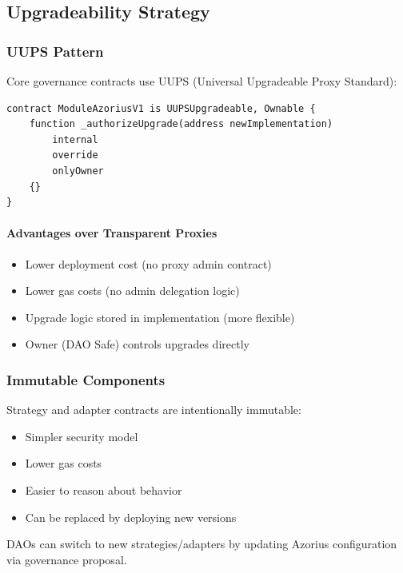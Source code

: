 \subsection{Upgradeability Strategy}

\subsubsection{UUPS Pattern}

Core governance contracts use UUPS (Universal Upgradeable Proxy Standard):

\begin{lstlisting}[caption=UUPS Upgrade Authorization]
contract ModuleAzoriusV1 is UUPSUpgradeable, Ownable {
    function _authorizeUpgrade(address newImplementation)
        internal
        override
        onlyOwner
    {}
}
\end{lstlisting}

\paragraph{Advantages over Transparent Proxies}
\begin{itemize}
    \item Lower deployment cost (no proxy admin contract)
    \item Lower gas costs (no admin delegation logic)
    \item Upgrade logic stored in implementation (more flexible)
    \item Owner (DAO Safe) controls upgrades directly
\end{itemize}

\subsubsection{Immutable Components}

Strategy and adapter contracts are intentionally immutable:
\begin{itemize}
    \item Simpler security model
    \item Lower gas costs
    \item Easier to reason about behavior
    \item Can be replaced by deploying new versions
\end{itemize}

DAOs can switch to new strategies/adapters by updating Azorius configuration via governance proposal.

